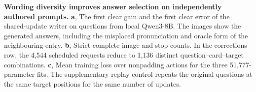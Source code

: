 \textbf{Wording diversity improves answer selection on independently authored prompts.} \textbf{a}, The first clear gain and the first clear error of the shared-update writer on questions from local Qwen3-8B. The images show the generated answers, including the misplaced pronunciation and oracle form of the neighbouring entry. \textbf{b}, Strict complete-image and stop counts. In the corrections row, the 4,544 scheduled requests reduce to 1,136 distinct question--card--target combinations. \textbf{c}, Mean training loss over nonpadding actions for the three 51,777-parameter fits. The supplementary replay control repeats the original questions at the same target positions for the same number of updates.
